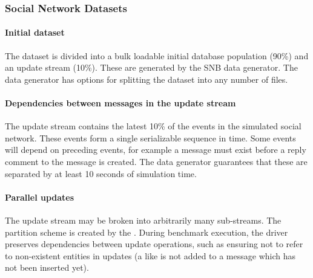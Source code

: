 
\subsubsection{Social Network Datasets}
\label{sec:sn-datasets}

\paragraph{Initial dataset}
The dataset is divided into a bulk loadable initial database population (90\%) and an update stream (10\%). These are generated by the SNB data generator. The data generator has options for splitting the dataset into any number of files.

\paragraph{Dependencies between messages in the update stream}
The update stream contains the latest 10\% of the events in the simulated social network. These events form a single serializable sequence in time. Some events will depend on preceding events, for example a message must exist before a reply comment to the message is created. The data generator guarantees that these are separated by at least 10 seconds of simulation time.

\paragraph{Parallel updates}
The update stream may be broken into arbitrarily many sub-streams. The partition scheme is created by the \datagen. During benchmark execution, the driver preserves dependencies between update operations, such as ensuring not to refer to non-existent entities in updates (\eg a like is not added to a message which has not been inserted yet).

